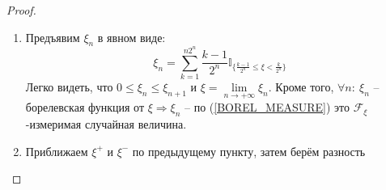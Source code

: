 \documentclass[a4paper,12pt]{article}
\renewcommand{\leq}{\ensuremath{\leqslant}}
\theoremstyle{plain}
\theoremstyle{definition}
\theoremstyle{remark}
\begin{document}
\begin{proof}
  \begin{enumerate}
    \item Предъявим $\xi_n$ в явном виде:
    \[\xi_n = \sum_{k = 1}^{n2^n}\frac{k - 1}{2^n}\mathbb{I}_{\{\frac{k - 1}{2^n} \leq \xi < \frac{k}{2^n}\}}\]
    Легко видеть, что $0 \leq \xi_n \leq \xi_{n + 1}$ и $\xi = \lim\limits_{n \to +\infty} \xi_n$. Кроме того, $\forall n:\: \xi_n$ -- борелевская функция от $\xi \Rightarrow \xi_n$ -- по (\ref{BOREL_MEASURE}) это $\mathcal{F}_\xi$-измеримая случайная величина.
    \item Приближаем $\xi^+$ и $\xi^-$ по предыдущему пункту, затем берём разность
  \end{enumerate}
\end{proof}
\end{document}
